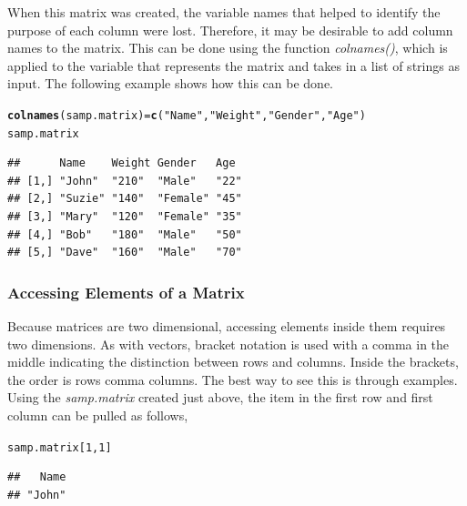 \documentclass{report}\usepackage[]{graphicx}\usepackage[]{color}
\makeatletter
\newcommand{\hlnum}[1]{\textcolor[rgb]{0.686,0.059,0.569}{#1}}%
\newcommand{\hlstr}[1]{\textcolor[rgb]{0.192,0.494,0.8}{#1}}%
\newcommand{\hlstd}[1]{\textcolor[rgb]{0.345,0.345,0.345}{#1}}%
\newcommand{\hlkwb}[1]{\textcolor[rgb]{0.69,0.353,0.396}{#1}}%
\newcommand{\hlkwd}[1]{\textcolor[rgb]{0.737,0.353,0.396}{\textbf{#1}}}%
\newenvironment{kframe}{%
 \def\at@end@of@kframe{}%
 \ifinner\ifhmode%
  \def\at@end@of@kframe{\end{minipage}}%
  \begin{minipage}{\columnwidth}%
 \fi\fi%
 \def\FrameCommand##1{\hskip\@totalleftmargin \hskip-\fboxsep
 \colorbox{shadecolor}{##1}\hskip-\fboxsep
     \hskip-\linewidth \hskip-\@totalleftmargin \hskip\columnwidth}%
 \MakeFramed {\advance\hsize-\width
   \@totalleftmargin\z@ \linewidth\hsize
   \@setminipage}}%
 {\par\unskip\endMakeFramed%
 \at@end@of@kframe}
\newenvironment{knitrout}{}{} %
\makeatother
\begin{document}
When this matrix was created, the variable names that helped to identify the purpose of each column were lost.  Therefore, it may be desirable to add column names to the matrix.  This can be done using the function \textit{colnames()}, which is applied to the variable that represents the matrix and takes in a list of strings as input.  The following example shows how this can be done.  
\begin{knitrout}
\color{fgcolor}\begin{kframe}
\begin{alltt}
\hlkwd{colnames}\hlstd{(samp.matrix)} \hlkwb{=} \hlkwd{c}\hlstd{(}\hlstr{"Name"}\hlstd{,} \hlstr{"Weight"}\hlstd{,} \hlstr{"Gender"}\hlstd{,} \hlstr{"Age"}\hlstd{)}
\hlstd{samp.matrix}
\end{alltt}
\begin{verbatim}
##      Name    Weight Gender   Age 
## [1,] "John"  "210"  "Male"   "22"
## [2,] "Suzie" "140"  "Female" "45"
## [3,] "Mary"  "120"  "Female" "35"
## [4,] "Bob"   "180"  "Male"   "50"
## [5,] "Dave"  "160"  "Male"   "70"
\end{verbatim}
\end{kframe}
\end{knitrout}



\subsubsection{Accessing Elements of a Matrix}
Because matrices are two dimensional, accessing elements inside them requires two dimensions.  As with vectors, bracket notation is used with a comma in the middle indicating the distinction between rows and columns.  Inside the brackets, the order is rows comma columns.  The best way to see this is through examples.  Using the \textit{samp.matrix} created just above, the item in the first row and first column can be pulled as follows, 
\begin{knitrout}
\color{fgcolor}\begin{kframe}
\begin{alltt}
\hlstd{samp.matrix[}\hlnum{1}\hlstd{,}\hlnum{1}\hlstd{]}
\end{alltt}
\begin{verbatim}
##   Name 
## "John"
\end{verbatim}
\end{kframe}
\end{knitrout}
\end{document}
